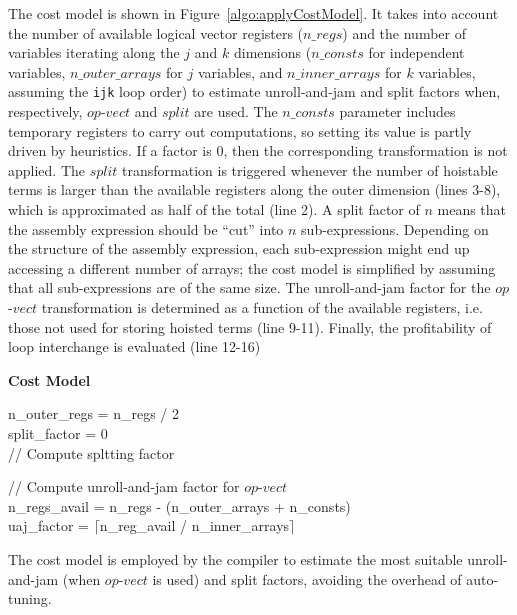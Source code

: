 \documentclass[conference]{IEEEtran}
\begin{document}
The cost model is shown in Figure~\ref{algo:applyCostModel}. It takes into account the number of available logical vector registers ($n\_regs$) and the number of variables iterating along the $j$ and $k$ dimensions ($n\_consts$ for independent variables, $n\_outer\_arrays$ for $j$ variables, and $n\_inner\_arrays$ for $k$ variables, assuming the \texttt{ijk} loop order) to estimate unroll-and-jam and split factors when, respectively, $op$-$vect$ and $split$ are used. The $n\_consts$ parameter includes temporary registers to carry out computations, so setting its value is partly driven by heuristics. If a factor is 0, then the corresponding transformation is not applied. The $split$ transformation is triggered whenever the number of hoistable terms is larger than the available registers along the outer dimension (lines 3-8), which is approximated as half of the total (line 2). A split factor of $n$ means that the assembly expression should be ``cut'' into $n$ sub-expressions. Depending on the structure of the assembly expression, each sub-expression might end up accessing a different number of arrays; the cost model is simplified by assuming that all sub-expressions are of the same size. The unroll-and-jam factor for the $op$-$vect$ transformation is determined as a function of the available registers, i.e. those not used for storing hoisted terms (line 9-11). Finally, the profitability of loop interchange is evaluated (line 12-16)



\begin{algorithm}[t]
\label{algo:applyCostModel}
  \textbf{Cost Model}\\

n\_outer\_regs = n\_regs / 2 \\
split\_factor = 0 \\ 
// Compute spltting factor \\

// Compute unroll-and-jam factor for $op$-$vect$ \\
n\_regs\_avail = n\_regs - (n\_outer\_arrays + n\_consts)\\
uaj\_factor = $\lceil$n\_reg\_avail / n\_inner\_arrays$\rceil$ \\
\caption{The cost model is employed by the compiler to estimate the most suitable unroll-and-jam (when $op$-$vect$ is used) and split factors, avoiding the overhead of auto-tuning.}
\end{algorithm}
\end{document}
